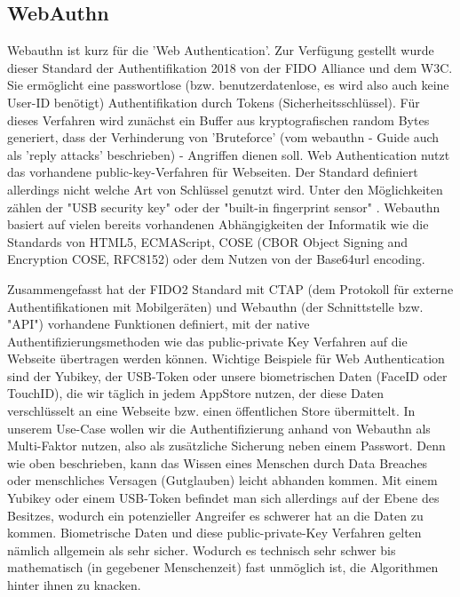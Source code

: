 \subsection{WebAuthn}
Webauthn ist kurz für die 'Web Authentication'. Zur Verfügung gestellt wurde dieser Standard der Authentifikation 2018 von der FIDO Alliance und dem W3C. \cite{A7} Sie ermöglicht eine passwortlose (bzw. benutzerdatenlose, es wird also auch keine User-ID benötigt) Authentifikation durch Tokens (Sicherheitsschlüssel). Für dieses Verfahren wird zunächst ein Buffer aus kryptografischen random Bytes generiert, dass der Verhinderung von 'Bruteforce' (vom webauthn - Guide auch als 'reply attacks' beschrieben) - Angriffen dienen soll. Web Authentication nutzt das vorhandene public-key-Verfahren für Webseiten. Der Standard definiert allerdings nicht welche Art von Schlüssel genutzt wird. Unter den Möglichkeiten zählen der "USB security key" \cite{A7} oder der "built-in fingerprint sensor" \cite{A7}. Webauthn basiert auf vielen bereits vorhandenen Abhängigkeiten der Informatik wie die Standards von HTML5, ECMAScript, COSE (CBOR Object Signing and Encryption COSE, RFC8152) oder dem Nutzen von der Base64url encoding.

Zusammengefasst hat der FIDO2 Standard mit CTAP (dem Protokoll für externe Authentifikationen mit Mobilgeräten) und Webauthn (der Schnittstelle bzw. "API") vorhandene Funktionen definiert, mit der native Authentifizierungsmethoden wie das public-private Key Verfahren auf die Webseite übertragen werden können. Wichtige Beispiele für Web Authentication sind der Yubikey, der USB-Token oder unsere biometrischen Daten (FaceID oder TouchID), die wir täglich in jedem AppStore nutzen, der diese Daten verschlüsselt an eine Webseite bzw. einen öffentlichen Store übermittelt. In unserem Use-Case wollen wir die Authentifizierung anhand von Webauthn als Multi-Faktor nutzen, also als zusätzliche Sicherung neben einem Passwort. Denn wie oben beschrieben, kann das Wissen eines Menschen durch Data Breaches oder menschliches Versagen (Gutglauben) leicht abhanden kommen. Mit einem Yubikey oder einem USB-Token befindet man sich allerdings auf der Ebene des Besitzes, wodurch ein potenzieller Angreifer es schwerer hat an die Daten zu kommen. Biometrische Daten und diese public-private-Key Verfahren gelten nämlich allgemein als sehr sicher. Wodurch es technisch sehr schwer bis mathematisch (in gegebener Menschenzeit) fast unmöglich ist, die Algorithmen hinter ihnen zu knacken.
